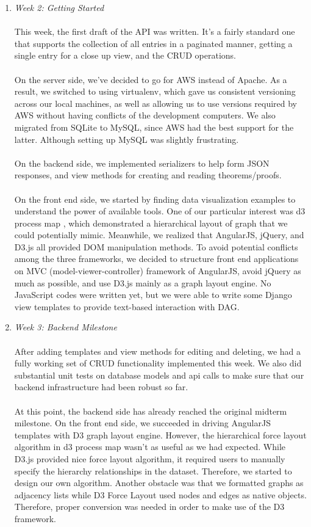 \documentclass{acm_proc_article-sp}
\begin{document}
\begin{enumerate}
\item \emph{Week 2: Getting Started }\\\\
This week, the first draft of the API was written. It's a fairly
standard one that supports the collection of all entries in
a paginated manner, getting a single entry for a close up view,
and the CRUD operations. \\\\
On the server side, we've decided to go for AWS instead of Apache. As a result, we switched to using virtualenv, which gave us consistent versioning across our local machines, as well as allowing us to use versions required by AWS without having conflicts of the development computers. We also migrated from SQLite to MySQL, since AWS had the best support for the latter. Although setting up MySQL was slightly frustrating.\\\\
On the backend side, we implemented serializers to help form JSON responses, and view methods for creating and reading theorems/proofs.\\\\
On the front end side, we started by finding data visualization examples to understand the power of available tools. One of our particular interest was d3 process map \cite{Nylen:2014:Online}, which demonstrated a hierarchical layout of graph that we could potentially mimic. Meanwhile, we realized that AngularJS, jQuery, and D3.js all provided DOM manipulation methods. To avoid potential conflicts among the three frameworks,  we decided to structure front end applications on MVC (model-viewer-controller) framework of AngularJS, avoid jQuery as much as possible, and use D3.js mainly as a graph layout engine. No JavaScript codes were written yet, but we were able to write some Django view templates to provide text-based interaction with DAG.\\

\item \emph{Week 3: Backend Milestone}\\\\
After adding templates and view methods for editing and deleting, we had a fully working set of CRUD functionality implemented this week. We also did substantial unit tests on database models and api calls to make sure that our backend infrastructure had been robust so far. \\\\
At this point, the backend side has already reached the original midterm milestone. On the front end side, we succeeded in driving AngularJS templates with D3 graph layout engine. However, the hierarchical force layout algorithm in d3 process map wasn't as useful as we had expected. While D3.js provided nice force layout algorithm, it required users to manually specify the hierarchy relationships in the dataset.  Therefore, we started to design our own algorithm. Another obstacle was that we formatted graphs as adjacency lists while D3 Force Layout used nodes and edges as native objects. Therefore, proper conversion was needed in order to make use of the D3 framework.\\


\end{enumerate}
\end{document}
